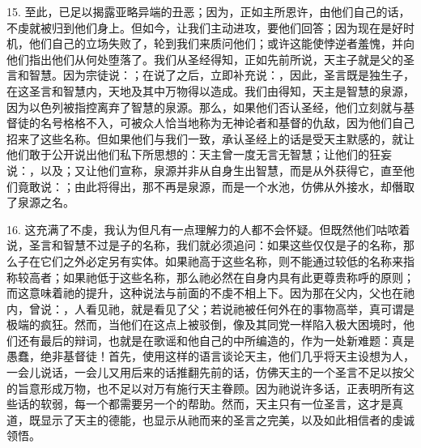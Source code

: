 15. 至此，已足以揭露亚略异端的丑恶；因为，正如主所恩许，由他们自己的话，不虔就被归到他们身上。但如今，让我们主动进攻，要他们回答；因为现在是好时机，他们自己的立场失败了，轮到我们来质问他们；或许这能使悖逆者羞愧，并向他们指出他们从何处堕落了。我们从圣经得知，正如先前所说，天主子就是父的圣言和智慧。因为宗徒说：；在说了之后，立即补充说：，因此，圣言既是独生子，在这圣言和智慧内，天地及其中万物得以造成。我们由得知，天主是智慧的泉源，因为以色列被指控离弃了智慧的泉源。那么，如果他们否认圣经，他们立刻就与基督徒的名号格格不入，可被众人恰当地称为无神论者和基督的仇敌，因为他们自己招来了这些名称。但如果他们与我们一致，承认圣经上的话是受天主默感的，就让他们敢于公开说出他们私下所思想的：天主曾一度无言无智慧；让他们的狂妄说：，以及；又让他们宣称，泉源并非从自身生出智慧，而是从外获得它，直至他们竟敢说：；由此将得出，那不再是泉源，而是一个水池，仿佛从外接水，却僭取了泉源之名。\par

16. 这充满了不虔，我认为但凡有一点理解力的人都不会怀疑。但既然他们咕哝着说，圣言和智慧不过是子的名称，我们就必须追问：如果这些仅仅是子的名称，那么子在它们之外必定另有实体。如果祂高于这些名称，则不能通过较低的名称来指称较高者；如果祂低于这些名称，那么祂必然在自身内具有此更尊贵称呼的原则；而这意味着祂的提升，这种说法与前面的不虔不相上下。因为那在父内，父也在祂内，曾说：，人看见祂，就是看见了父；若说祂被任何外在的事物高举，真可谓是极端的疯狂。然而，当他们在这点上被驳倒，像及其同党一样陷入极大困境时，他们还有最后的辩词，也就是在歌谣和他自己的中所编造的，作为一处新难题：真是愚蠢，绝非基督徒！首先，使用这样的语言谈论天主，他们几乎将天主设想为人，一会儿说话，一会儿又用后来的话推翻先前的话，仿佛天主的一个圣言不足以按父的旨意形成万物，也不足以对万有施行天主眷顾。因为祂说许多话，正表明所有这些话的软弱，每一个都需要另一个的帮助。然而，天主只有一位圣言，这才是真道，既显示了天主的德能，也显示从祂而来的圣言之完美，以及如此相信者的虔诚领悟。\par


